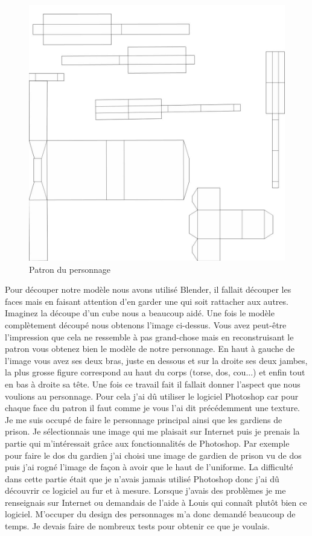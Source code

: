 \documentclass[12pt]{article}
\begin{document}
\newpage

\begin{figure}[t]
\begin{center}
\includegraphics[scale=0.3]{decoupe.jpg}
\caption{Patron du personnage}
\end{center}
\end{figure}


\par
Pour découper notre modèle nous avons utilisé Blender, il fallait découper les faces mais en faisant attention d'en garder une qui soit rattacher aux autres. Imaginez la découpe d'un cube nous a beaucoup aidé. Une fois le modèle complètement découpé nous obtenons l'image ci-dessus. Vous avez peut-être l'impression que cela ne ressemble à pas grand-chose mais en reconstruisant le patron vous obtenez bien le modèle de notre personnage. En haut à gauche de l'image vous avez ses deux bras, juste en dessous et sur la droite ses deux jambes, la plus grosse figure correspond au haut du corps (torse, dos, cou...) et enfin tout en bas à droite sa tête. Une fois ce travail fait il fallait donner l'aspect que nous voulions au personnage. Pour cela j'ai dû utiliser le logiciel Photoshop car pour chaque face du patron il faut comme je vous l'ai dit précédemment une texture. Je me suis occupé de faire le personnage principal ainsi que les gardiens de prison. Je sélectionnais une image qui me plaisait sur Internet puis je prenais la partie qui m'intéressait grâce aux fonctionnalités de Photoshop. Par exemple pour faire le dos du gardien j'ai choisi une image de gardien de prison vu de dos puis j'ai rogné l'image de façon à avoir que le haut de l'uniforme. La difficulté dans cette partie était que je n'avais jamais utilisé Photoshop donc j'ai dû découvrir ce logiciel au fur et à mesure. Lorsque j'avais des problèmes je me renseignais sur Internet ou demandais de l'aide à Louis qui connaît plutôt bien ce logiciel. M'occuper du design des personnages m'a donc demandé beaucoup de temps. Je devais faire de nombreux tests pour obtenir ce que je voulais.
\newline
\end{document}
